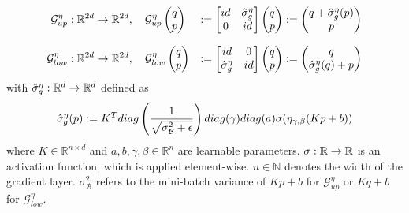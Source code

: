 \documentclass[twoside,a4paper]{article}
\begin{document}
\begin{alignat*}{2}
	\mathcal{G}^{\eta}_{up} &: \mathbb{R}^{2d} \to \mathbb{R}^{2d}, \quad
	\mathcal{G}^{\eta}_{up} \begin{pmatrix} q \\ p \end{pmatrix} &:= \begin{bmatrix} id & {\hat{\sigma}^{\eta}_g} \\ 0 & id \end{bmatrix} \begin{pmatrix} q \\ p \end{pmatrix} := \begin{pmatrix}
		q + \hat{\sigma}^{\eta}_g(p) \\
		p
	\end{pmatrix} \\[7pt]
	\mathcal{G}^{\eta}_{low} &: \mathbb{R}^{2d} \to \mathbb{R}^{2d}, \quad
	\mathcal{G}^{\eta}_{low} \begin{pmatrix} q \\ p \end{pmatrix} &:= \begin{bmatrix} id & 0 \\ {\hat{\sigma}^{\eta}_g} & id \end{bmatrix} \begin{pmatrix} q \\ p \end{pmatrix} := \begin{pmatrix}
		q \\
		\hat{\sigma}^{\eta}_g(q) + p
	\end{pmatrix}
\end{alignat*}
with $\hat{\sigma}^{\eta}_g : \mathbb{R}^d \to \mathbb{R}^d$ defined as
\begin{equation*}
	\hat{\sigma}^{\eta}_g(p) := 
	K^T diag\left( \frac{1}{\sqrt{\sigma^2_\mathcal{B} + \epsilon}} \right) diag(\gamma)
	diag(a) \sigma(\eta_{\gamma, \beta}(Kp+b))
\end{equation*}
where $K \in \mathbb{R}^{n \times d}$ and $a,b, \gamma, \beta \in \mathbb{R}^n$
are learnable parameters. $\sigma : \mathbb{R} \to \mathbb{R}$ 
is an activation function, which is applied element-wise.
$n \in \mathbb{N}$ denotes the width of the gradient layer.
$\sigma^2_\mathcal{B}$ refers to the mini-batch variance of $Kp+b$ for $\mathcal{G}^{\eta}_{up}$
or $Kq+b$ for $\mathcal{G}^{\eta}_{low}$.



\end{document}
